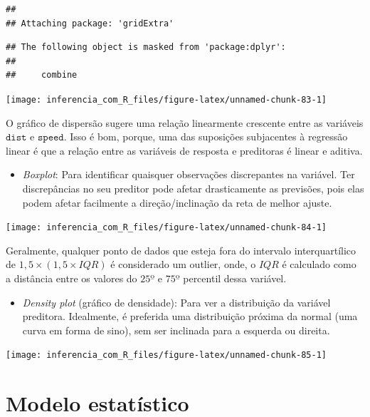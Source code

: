 \documentclass[
]{book}
\providecommand{\tightlist}{%
  \setlength{\itemsep}{0pt}\setlength{\parskip}{0pt}}
\begin{document}
\begin{verbatim}
## 
## Attaching package: 'gridExtra'
\end{verbatim}

\begin{verbatim}
## The following object is masked from 'package:dplyr':
## 
##     combine
\end{verbatim}

\begin{center}\texttt{[image: inferencia\_com\_R\_files/figure-latex/unnamed-chunk-83-1]} \end{center}

O gráfico de dispersão sugere uma relação linearmente crescente entre as variáveis \(\texttt{dist}\) e \(\texttt{speed}\). Isso é bom, porque, uma das suposições subjacentes à regressão linear é que a relação entre as variáveis de resposta e preditoras é linear e aditiva.

\begin{itemize}
\tightlist
\item
  \emph{Boxplot}: Para identificar quaisquer observações discrepantes na variável. Ter discrepâncias no seu preditor pode afetar drasticamente as previsões, pois elas podem afetar facilmente a direção/inclinação da reta de melhor ajuste.
\end{itemize}

\begin{center}\texttt{[image: inferencia\_com\_R\_files/figure-latex/unnamed-chunk-84-1]} \end{center}

Geralmente, qualquer ponto de dados que esteja fora do intervalo interquartílico de \(1,5\times(1,5 \times IQR)\) é considerado um outlier, onde, o \(IQR\) é calculado como a distância entre os valores do \(25º\) e \(75º\) percentil dessa variável.

\begin{itemize}
\tightlist
\item
  \emph{Density plot} (gráfico de densidade): Para ver a distribuição da variável preditora. Idealmente, é preferida uma distribuição próxima da normal (uma curva em forma de sino), sem ser inclinada para a esquerda ou direita.
\end{itemize}

\begin{center}\texttt{[image: inferencia\_com\_R\_files/figure-latex/unnamed-chunk-85-1]} \end{center}

\hypertarget{modelo-estatuxedstico}{%
\section{Modelo estatístico}\label{modelo-estatuxedstico}}
\end{document}
